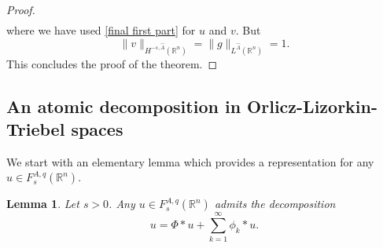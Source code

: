 \documentclass[leqno,twoside, 12pt]{amsart}
\theoremstyle{plain}
\numberwithin{equation}{section} \numberwithin{figure}{section}
\newtheorem{lemma}[theorem]{Lemma}
\theoremstyle{definition}
\newcommand{\R}{\mathbb R}
\numberwithin{equation}{section}
\begin{document}
\begin{proof}
\begin{equation*}
\begin{split}
\end{split}
\end{equation*}
where we have used \eqref{final first part} for $u$ and $v$.  But
$$\|v\|_{H^{-s, \hat A}(\R^n)}=\|g\|_{L^{\hat A}(\R^n)}=1.$$This concludes the proof of the theorem.
\end{proof}


\subsection{An atomic decomposition in Orlicz-Lizorkin-Triebel spaces}

We start with an elementary lemma which provides a representation for any $u\in F_s^{A,q}(\R^n)$.
\begin{lemma}Let $s>0$. Any $u\in F_s^{A,q}(\R^n)$ admits the decomposition
\begin{equation}\label{representation}
u=\Phi*u+\sum_{k=1}^\infty\phi_k*u.
\end{equation}
\end{lemma}
\end{document}

